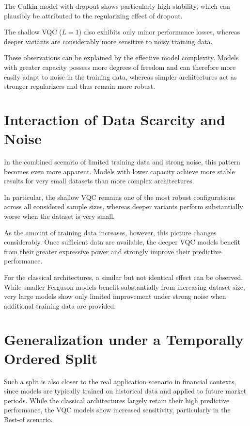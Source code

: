 The Culkin model with dropout shows particularly high stability,
which can plausibly be attributed to the regularizing effect of
dropout.

The shallow VQC ($L=1$) also exhibits only minor performance losses,
whereas deeper variants are considerably more sensitive to noisy
training data.

These observations can be explained by the effective model complexity.
Models with greater capacity possess more degrees of freedom and can
therefore more easily adapt to noise in the training data, whereas
simpler architectures act as stronger regularizers and thus remain
more robust.

\section{Interaction of Data Scarcity and Noise}

In the combined scenario of limited training data and strong noise,
this pattern becomes even more apparent. Models with lower capacity
achieve more stable results for very small datasets than more complex
architectures.

In particular, the shallow VQC remains one of the most robust
configurations across all considered sample sizes, whereas deeper
variants perform substantially worse when the dataset is very small.

As the amount of training data increases, however, this picture
changes considerably. Once sufficient data are available, the deeper
VQC models benefit from their greater expressive power and strongly
improve their predictive performance.

For the classical architectures, a similar but not identical effect
can be observed. While smaller Ferguson models benefit substantially
from increasing dataset size, very large models show only limited
improvement under strong noise when additional training data are
provided.


\section{Generalization under a Temporally Ordered Split}

Such a split is also closer to the real application scenario in
financial contexts, since models are typically trained on historical
data and applied to future market periods. While the classical
architectures largely retain their high predictive performance,
the VQC models show increased sensitivity, particularly in the
Best-of scenario.

